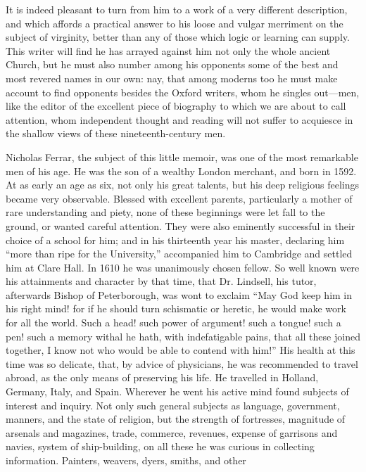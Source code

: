 It is indeed pleasant to turn from him to a work of
a very different description, and which affords a practical answer to
his loose and vulgar merriment on the subject of virginity, better than
any of those which logic or learning can supply. This writer will find
he has arrayed against him not only the whole ancient Church, but he
must also number among his opponents some of the best and most revered
names in our own: nay, that among moderns too he must make account to
find opponents besides the Oxford writers, whom he singles
out—men, like the editor of the excellent piece of biography to which
we are about to call attention, whom independent thought and reading
will not suffer to acquiesce in the shallow views of these
nineteenth-century men.

Nicholas Ferrar, the subject of this little memoir,
was one of the most remarkable men of his age. He was the son of a
wealthy London merchant, and born in 1592. At as early an age as six,
not only his great talents, but his deep religious feelings became very
observable. Blessed with excellent parents, particularly a mother of
rare understanding and piety, none of these beginnings were let fall to
the ground, or wanted careful attention. They were also eminently
successful in their choice of a school for him; and in his thirteenth
year his master, declaring him ``more than ripe for the University,''
accompanied him to Cambridge and settled him at Clare Hall. In 1610 he
was unanimously chosen fellow. So well known were his attainments and
character by that time, that Dr. Lindsell, his tutor, afterwards Bishop
of Peterborough, was wont to exclaim ``May God keep him in his right
mind! for if he should turn schismatic or heretic, he would make work
for all the world. Such a head! such power of argument! such a tongue!
such a pen! such a memory withal he hath, with indefatigable pains, that
all these joined together, I know not who would be able to contend with
him!'' His health at this time was so delicate, that, by advice of
physicians, he was recommended to travel abroad, as the only means of
preserving his life. He travelled in Holland, Germany, Italy, and Spain.
Wherever he went his active mind found subjects of interest and inquiry.
Not only such general subjects as language, government, manners, and the
state of religion, but the strength of fortresses, magnitude of arsenals
and magazines, trade, commerce, revenues, expense of garrisons and
navies, system of ship-building, on all these he was curious in
collecting information. Painters, weavers, dyers, smiths, and other

